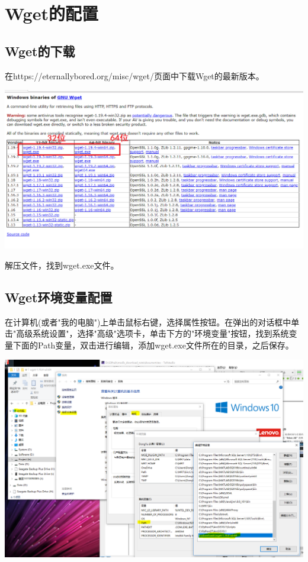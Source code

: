 \documentclass{article}
\begin{document}
	\section{Wget的配置}
	
	\subsection{Wget的下载}
	在https://eternallybored.org/misc/wget/页面中下载Wget的最新版本。
	
	\includegraphics[width=\linewidth]{sec3_1.png}
	
	解压文件，找到wget.exe文件。
	
	\subsection{Wget环境变量配置}
	
	在计算机(或者"我的电脑")上单击鼠标右键，选择属性按钮。在弹出的对话框中单击"高级系统设置"，选择"高级"选项卡，单击下方的"环境变量"按钮，找到系统变量下面的Path变量，双击进行编辑，添加wget.exe文件所在的目录，之后保存。
	
	\includegraphics[width=\linewidth]{sec3_2.png}
	
\end{document}
